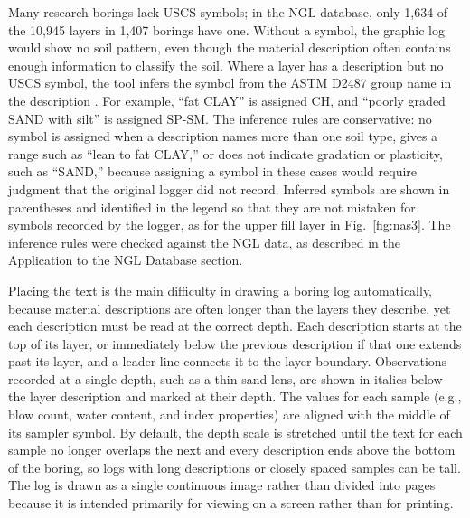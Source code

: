 \documentclass[Journal,letterpaper,InsideFigs]{ascelike-new}
\begin{document}
Many research borings lack USCS symbols; in the NGL database, only 1,634 of the 10,945 layers in 1,407 borings have one. Without a symbol, the graphic log would show no soil pattern, even though the material description often contains enough information to classify the soil. Where a layer has a description but no USCS symbol, the tool infers the symbol from the ASTM D2487 group name in the description \cite{ASTM2017a}. For example, ``fat CLAY'' is assigned CH, and ``poorly graded SAND with silt'' is assigned SP-SM. The inference rules are conservative: no symbol is assigned when a description names more than one soil type, gives a range such as ``lean to fat CLAY,'' or does not indicate gradation or plasticity, such as ``SAND,'' because assigning a symbol in these cases would require judgment that the original logger did not record. Inferred symbols are shown in parentheses and identified in the legend so that they are not mistaken for symbols recorded by the logger, as for the upper fill layer in Fig.~\ref{fig:nas3}.  The inference rules were checked against the NGL data, as described in the Application to the NGL Database section.

Placing the text is the main difficulty in drawing a boring log automatically, because material descriptions are often longer than the layers they describe, yet each description must be read at the correct depth. Each description starts at the top of its layer, or immediately below the previous description if that one extends past its layer, and a leader line connects it to the layer boundary. Observations recorded at a single depth, such as a thin sand lens, are shown in italics below the layer description and marked at their depth. The values for each sample (e.g., blow count, water content, and index properties) are aligned with the middle of its sampler symbol. By default, the depth scale is stretched until the text for each sample no longer overlaps the next and every description ends above the bottom of the boring, so logs with long descriptions or closely spaced samples can be tall.  The log is drawn as a single continuous image rather than divided into pages because it is intended primarily for viewing on a screen rather than for printing.
\end{document}
